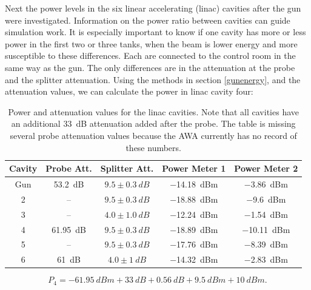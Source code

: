 Next the power levels in the six linear accelerating (linac) cavities after the gun
were investigated. Information on the power ratio between cavities can 
guide simulation work. It is especially important to know if one cavity
has more or less power in the first two or three tanks, when the beam is 
lower energy and more susceptible to these differences.
Each are connected to the control room in the same way as the gun. 
The only differences are in the attenuation at the  probe and 
the splitter attenuation.  Using the methods in section \ref{gunenergy}, 
and the attenuation values, we can calculate the power in linac cavity four:
\begin{table} %
	\caption{\label{tab:powerlinac} Power and attenuation values for the 
		linac cavities. Note that all cavities have an additional 
		\SI{33}{dB} attenuation added after the probe.
		The table is missing several probe attenuation values because the
		AWA currently has no record of these numbers.}
	\begin{center}
		\begin{tabular}{ccccc}	
			\toprule
			\toprule
			\textbf{Cavity} & \textbf{Probe Att.} & \textbf{Splitter Att.} & \textbf{Power Meter 1}  & \textbf{Power Meter 2} \\
			\midrule
			Gun & \SI{53.2}{dB}& $9.5 \pm \SI{0.3}{dB}$ & \SI{-14.18}{dBm} & \SI{-3.86}{dBm}  \\
			2 & --       & $9.5 \pm \SI{0.3}{dB}$ & \SI{-18.88}{dBm} & \SI{-9.6}{dBm}  \\
			3 & --       & $4.0 \pm \SI{1.0}{dB}$ & \SI{-12.24}{dBm} & \SI{-1.54}{dBm}  \\
			4 & \SI{61.95}{dB} & $9.5 \pm \SI{0.3}{dB}$ & \SI{-18.89}{dBm} & \SI{-10.11}{dBm}  \\
			5 & --       & $9.5 \pm \SI{0.3}{dB}$ & \SI{-17.76}{dBm} & \SI{-8.39}{dBm}  \\
			6 & \SI{61}{dB}    & $4.0 \pm \SI{1}{dB}$  & \SI{-14.32}{dBm} & \SI{-2.83}{dBm} \\
			\bottomrule
		\end{tabular}
	\end{center}
\end{table}
\begin{equation}
P_4 = \SI{-61.95}{dBm} + \SI{33}{dB} + \SI{0.56}{dB} + \SI{9.5}{dBm} +\SI{10}{dBm}.
\end{equation}

